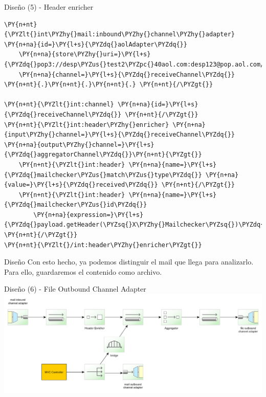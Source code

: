 \documentclass{beamer}
\begin{document}
\begin{frame}[fragile]{Diseño (5) - Header enricher}
\begin{Verbatim}[fontsize=\tiny,commandchars=\\\{\}]
\PY{n+nt}{\PYZlt{}int\PYZhy{}mail:inbound\PYZhy{}channel\PYZhy{}adapter} \PY{n+na}{id=}\PY{l+s}{\PYZdq{}aolAdapter\PYZdq{}}
    \PY{n+na}{store\PYZhy{}uri=}\PY{l+s}{\PYZdq{}pop3://desp\PYZus{}test2\PYZpc{}40aol.com:desp123@pop.aol.com/INBOX\PYZdq{}}
    \PY{n+na}{channel=}\PY{l+s}{\PYZdq{}receiveChannel\PYZdq{}} \PY{n+nt}{.}\PY{n+nt}{.}\PY{n+nt}{.} \PY{n+nt}{/\PYZgt{}}

\PY{n+nt}{\PYZlt{}int:channel} \PY{n+na}{id=}\PY{l+s}{\PYZdq{}receiveChannel\PYZdq{}} \PY{n+nt}{/\PYZgt{}}
\PY{n+nt}{\PYZlt{}int:header\PYZhy{}enricher} \PY{n+na}{input\PYZhy{}channel=}\PY{l+s}{\PYZdq{}receiveChannel\PYZdq{}} \PY{n+na}{output\PYZhy{}channel=}\PY{l+s}{\PYZdq{}aggregatorChannel\PYZdq{}}\PY{n+nt}{\PYZgt{}}
    \PY{n+nt}{\PYZlt{}int:header} \PY{n+na}{name=}\PY{l+s}{\PYZdq{}mailchecker\PYZus{}match\PYZus{}type\PYZdq{}} \PY{n+na}{value=}\PY{l+s}{\PYZdq{}received\PYZdq{}} \PY{n+nt}{/\PYZgt{}}
    \PY{n+nt}{\PYZlt{}int:header} \PY{n+na}{name=}\PY{l+s}{\PYZdq{}mailchecker\PYZus{}id\PYZdq{}} 
        \PY{n+na}{expression=}\PY{l+s}{\PYZdq{}payload.getHeader(\PYZsq{}X\PYZhy{}Mailchecker\PYZsq{})\PYZdq{}} \PY{n+nt}{/\PYZgt{}}
\PY{n+nt}{\PYZlt{}/int:header\PYZhy{}enricher\PYZgt{}}
\end{Verbatim}
\end{frame}

\begin{frame}{Diseño}
Con esto hecho, ya podemos distinguir el mail que llega para analizarlo.
Para ello, guardaremos el contenido como archivo.
\end{frame}

\begin{frame}{Diseño (6) - File Outbound Channel Adapter}
\includegraphics[width=1.0\linewidth]{sp-int-08}
\end{frame}
\end{document}
